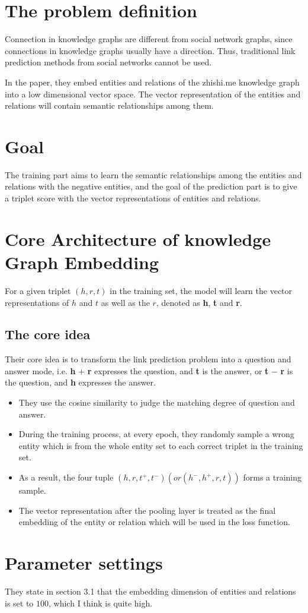 \documentclass[12pt] {article}
\begin{document}
\section*{The problem definition}
  Connection in knowledge graphs are different from social network graphs, since connections in knowledge graphs usually have a direction. Thus, traditional link prediction methods from social networks cannot be used.

  In the paper, they embed entities and relations of the zhishi.me knowledge graph into a low dimensional vector space. The vector representation of the entities and relations will contain semantic relationships among them.


\section*{Goal}
  The training part aims to learn the semantic relationships among the entities and relations with the negative entities, and the goal of the prediction part is to give a triplet score with the vector representations of entities and relations.


\section*{Core Architecture of knowledge Graph Embedding}
  For a given triplet $(h, r, t)$ in the training set, the model will learn the vector representations of $h$ and $t$ as well as the $r$, denoted as \textbf{h}, \textbf{t} and \textbf{r}.

  \subsection*{The core idea}
    Their core idea is to transform the link prediction problem into a question and answer mode, i.e. \textbf{h} $+$ \textbf{r} expresses the question, and \textbf{t} is the answer, or \textbf{t} $-$
    \textbf{r} is the question, and \textbf{h} expresses the answer.

  \begin{itemize}
    \item They use the cosine similarity to judge the matching degree of question and answer.
    \item During the training process, at every epoch, they randomly sample a wrong entity which is from the whole entity set to each correct triplet in the training set.
    \item As a result, the four tuple $(h, r, t^+ , t^- ) (or (h^- , h^+ , r, t))$ forms a training sample.
    \item The vector representation after the pooling layer is treated as the final embedding of the entity or relation which will be used in the loss function.
  \end{itemize}

\section*{Parameter settings}
  They state in section 3.1 that the embedding dimension of entities and relations is set to $100$, which I think is quite high.
\end{document}
